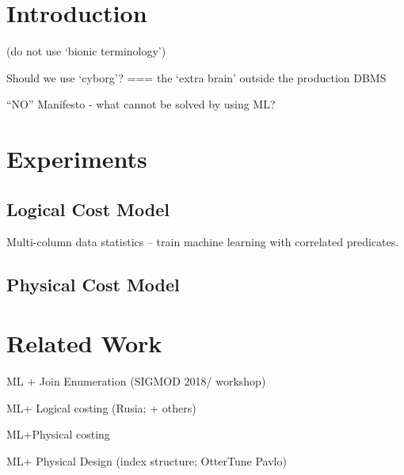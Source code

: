 \documentclass[a4paper,USenglish]{dfu}
\begin{document}
\section{Introduction}

(do not use ‘bionic terminology’)

Should we use ‘cyborg’? === the ‘extra brain’ outside the production DBMS

“NO” Manifesto - what cannot be solved by using ML?



\section{Experiments}

\subsection{Logical Cost Model}

Multi-column data statistics
  -- train machine learning with correlated predicates.



\subsection{Physical Cost Model}



\section{Related Work}

ML + Join Enumeration (SIGMOD 2018/ workshop)

ML+ Logical costing (Rusia; + others)

ML+Physical costing

ML+ Physical Design (index structure; OtterTune Pavlo)




\end{document}
